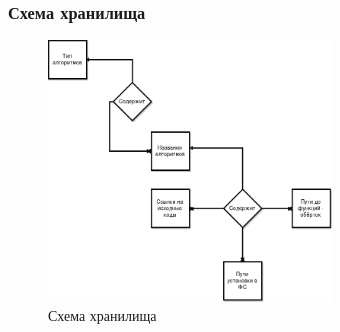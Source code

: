 \documentclass{beamer}
\begin{document}
\begin{frame}
    \frametitle{Схема хранилища}
    \begin{figure}
        \centering
        \includegraphics[width=0.67\textwidth]{db}
        \caption{Схема хранилища}
    \end{figure}
\end{frame}
\end{document}
